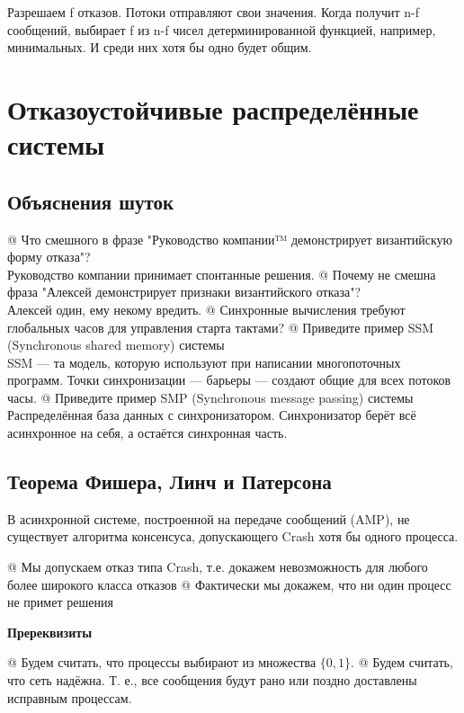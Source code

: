 Разрешаем f отказов. Потоки отправляют свои значения. Когда получит n-f сообщений, выбирает f из n-f чисел детерминированной функцией, например, минимальных. И среди них хотя бы одно будет общим.


\section{Отказоустойчивые распределённые системы}

\subsection{Объяснения шуток}
\begin{el}[ul]
@ Что смешного в фразе "Руководство компании™ демонстрирует византийскую форму отказа"? \\
Руководство компании принимает спонтанные решения.
@ Почему не смешна фраза "Алексей демонстрирует признаки византийского отказа"? \\
Алексей один, ему некому вредить.
@ Синхронные вычисления требуют глобальных часов для
управления старта тактами?
@ Приведите пример SSM (Synchronous shared memory) системы\\
SSM --- та модель, которую используют при написании многопоточных программ. Точки синхронизации --- барьеры --- создают общие для всех потоков часы.
@ Приведите пример SMP (Synchronous message passing) системы
Распределённая база данных с синхронизатором. Синхронизатор берёт всё асинхронное на себя, а остаётся синхронная часть.
\end{el}

\subsection{Теорема Фишера, Линч и Патерсона}
\begin{thm}
В асинхронной системе, построенной на передаче сообщений (AMP), не существует алгоритма консенсуса, допускающего Crash хотя бы одного процесса.
\end{thm}
\begin{note}
\begin{el}[ul]
@ Мы допускаем отказ типа Crash, т.е. докажем невозможность для
любого более широкого класса отказов
@ Фактически мы докажем, что ни один процесс не примет решения
\end{el}
\end{note}

\bf{Пререквизиты}
\begin{el}[ul]
@ Будем считать, что процессы выбирают из множества $\{0, 1\}$.
@ Будем считать, что сеть надёжна. Т. е., все сообщения будут рано или поздно доставлены исправным процессам.
\end{el}

